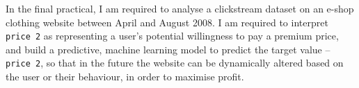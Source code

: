 \documentclass[12pt,twoside,a4paper]{article}
\begin{document}
In the final practical, I am required to analyse a clickstream dataset on an e-shop clothing website \cite{LapczynskiBialowas2013} between April and August 2008. I am required to interpret \texttt{price 2} as representing a user's potential willingness to pay a premium price, and build a predictive, machine learning model to predict the target value -- \texttt{price 2}, so that in the future the website can be dynamically altered based on the user or their behaviour, in order to maximise profit.
%
%
\end{document}
